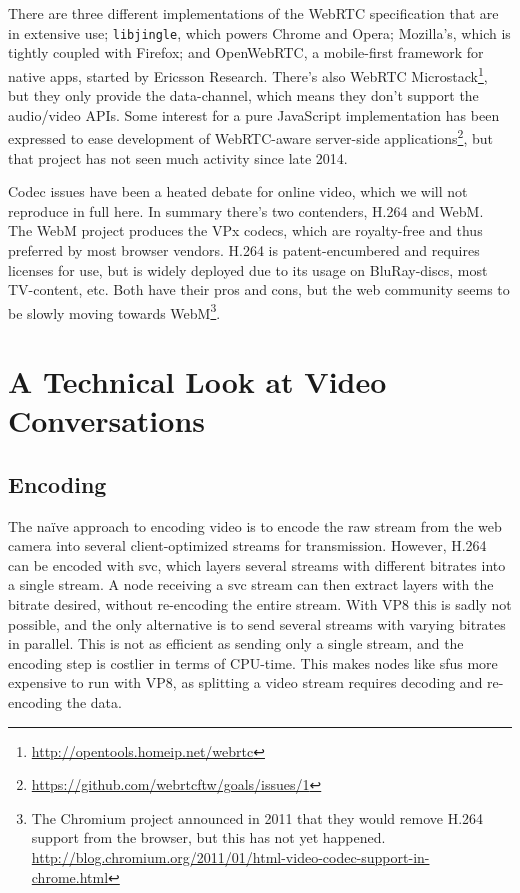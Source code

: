 There are three different implementations of the WebRTC specification that are in extensive use; \texttt{libjingle}, which powers Chrome and Opera; Mozilla's, which is tightly coupled with Firefox; and OpenWebRTC, a mobile-first framework for native apps, started by Ericsson Research. There's also WebRTC Microstack\footnote{\url{http://opentools.homeip.net/webrtc}}, but they only provide the data-channel, which means they don't support the audio/video APIs. Some interest for a pure JavaScript implementation has been expressed to ease development of WebRTC-aware server-side applications\footnote{\url{https://github.com/webrtcftw/goals/issues/1}}, but that project has not seen much activity since late 2014.

Codec issues have been a heated debate for online video, which we will not reproduce in full here. In summary there's two contenders, H.264 and WebM. The WebM project produces the VPx codecs, which are royalty-free and thus preferred by most browser vendors. H.264 is patent-encumbered and requires licenses for use, but is widely deployed due to its usage on BluRay-discs, most TV-content, etc. Both have their pros and cons, but the web community seems to be slowly moving towards WebM\footnote{The Chromium project announced in 2011 that they would remove H.264 support from the browser, but this has not yet happened. \url{http://blog.chromium.org/2011/01/html-video-codec-support-in-chrome.html}}.


\section{A Technical Look at Video Conversations}

\subsection{Encoding}

The naïve approach to encoding video is to encode the raw stream from the web camera into several client-optimized streams for transmission. However, H.264 can be encoded with \gls{svc}, which layers several streams with different bitrates into a single stream. A node receiving a \gls{svc} stream can then extract layers with the bitrate desired, without re-encoding the entire stream. With VP8 this is sadly not possible, and the only alternative is to send several streams with varying bitrates in parallel. This is not as efficient as sending only a single stream, and the encoding step is costlier in terms of CPU-time. This makes nodes like \glspl{sfu} more expensive to run with VP8, as splitting a video stream requires decoding and re-encoding the data.

